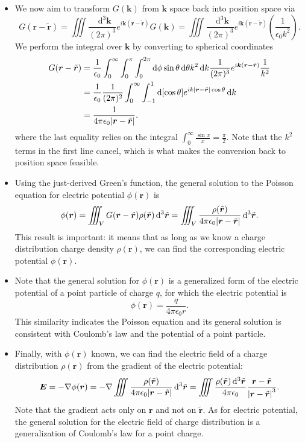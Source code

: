 \documentclass[11pt, a4paper]{article}
\newcommand{\diff}{\mathop{}\!\mathrm{d}} %
\newcommand{\dtr}{\diff^{3} \tilde{\r}}  %
\newcommand{\dk}{\diff^{3} \vec{k}}  %
\renewcommand{\vec}[1]{\bm{#1}} %
\renewcommand{\t}[1]{\tilde{#1}} %
\renewcommand{\r}{\vec{r}}
\renewcommand{\k}{\vec{k}}
\newcommand{\E}{\vec{E}} %
\newcommand{\ee}{\epsilon_{0}}  %
\renewcommand{\grad}{\nabla}
\begin{document}
\begin{itemize}
	\item We now aim to transform $ G(\k) $ from $ \k $ space back into position space via
	\begin{equation*}
		G(\r - \t{\r}) = \iiint \frac{\dk}{(2\pi)^{3}}e^{i\k(\r - \t{\r})}G(\k) = \iiint \frac{\dk}{(2\pi)^{3}}e^{i\k(\r - \t{\r})}\left(\frac{1}{\ee k^{2}}\right).
	\end{equation*}
	We perform the integral over $ \k $ by converting to spherical coordinates
	\begin{align*}
		G(\r - \t{\r}) &= \frac{1}{\ee}\int_{0}^{\infty} \int_{0}^{\pi} \int_{0}^{2\pi} \diff \phi \sin \theta \diff \theta k^{2} \diff k \frac{1}{(2\pi)^{3}}e^{i\k(\r - \t{\r})} \frac{1}{k^{2}} \\
		& = \frac{1}{\ee}\frac{1}{(2\pi)^{2}}\int_{0}^{\infty} \int_{-1}^{1} \diff [\cos \theta]  e^{ik\abs{\r - \t{\r}}\cos \theta} \diff k\\
		& = \frac{1}{4\pi \ee \abs{\r - \t{\r}}}.
	\end{align*}
	where the last equality relies on the integral $ \int_{0}^{\infty}\frac{\sin x}{x} = \frac{\pi}{2} $. Note that the $ k^{2} $ terms in the first line cancel, which is what makes the conversion back to position space feasible.
	
	\item  Using the just-derived Green's function, the general solution to the Poisson equation for electric potential $ \phi(\r) $  is
	\begin{equation*}
		\phi(\r) = \iiint_{V} G(\r - \t{\r})\rho(\t{\r}) \dtr = \iiint_{V} \frac{\rho(\t{\r})}{4\pi \ee \abs{\r - \t{\r}}}\dtr.
	\end{equation*}
	This result is important: it means that as long as we know a charge distribution charge density $ \rho(\r) $, we can find the corresponding electric potential $ \phi(\r) $. 
	
	\item Note that the general solution for $ \phi(\r) $ is a generalized form of the electric potential of a point particle of charge $ q $, for which the electric potential is
	\begin{equation*}
		\phi(\r) = \frac{q}{4\pi \ee r}.
	\end{equation*}
	This similarity indicates the Poisson equation and its general solution is consistent with Coulomb's law and the potential of a point particle.
	

	
	\item Finally, with $ \phi(\r) $ known, we can find the electric field of a charge distribution $ \rho(\r) $ from the gradient of the electric potential:
	\begin{equation*}
		\E = - \grad \phi(\r) = - \grad \iiint \frac{\rho(\t{\r})}{4\pi \ee \abs{\r - \t{\r}}}\dtr = \iiint \frac{\rho(\t{\r})\dtr}{4\pi \ee} \frac{\r - \t{\r}}{\abs{\r - \t{\r}}^{3}}.
	\end{equation*}
	Note that the gradient acts only on $ \r $ and not on $ \t{\r} $. As for electric potential, the general solution for the electric field of charge distribution is a generalization of Coulomb's law for a point charge. 
\end{itemize}
\end{document}
